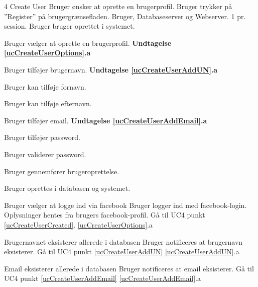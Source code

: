 
\uchead
	{4}
	{Create User}
	{Bruger ønsker at oprette en brugerprofil.}
	{Bruger trykker på ''Register'' på brugergrænsefladen.}
	{Bruger, Databaseserver og Webserver.}
	{} %
	{}
	{1 pr. session.}
	{Bruger bruger oprettet i systemet.}

\item \label{ucCreateUserOptions} Bruger vælger at oprette en brugerprofil. \newline
\textbf{Undtagelse \ref{ucCreateUserOptions}.a}

\item \label{ucCreateUserAddUN} Bruger tilføjer brugernavn.
\textbf{Undtagelse \ref{ucCreateUserAddUN}.a}

\item Bruger kan tilføje fornavn.
\item Bruger kan tilføje efternavn.

\item \label{ucCreateUserAddEmail} Bruger tilføjer email.
\textbf{Undtagelse \ref{ucCreateUserAddEmail}.a}

\item Bruger tilføjer password.

\item Bruger validerer password.

\item Bruger gennemfører brugeroprettelse.

\item \label{ucCreateUserCreated} Bruger oprettes i databasen og systemet.

\ucdescriptionend


\ucextension
	{Bruger vælger at logge ind via facebook}
	{Bruger logger ind med facebook-login. \newline
	\indent Oplysninger hentes fra brugers facebook-profil. \newline
	\indent Gå til UC4 punkt \ref{ucCreateUserCreated}.
	}
	{\ref{ucCreateUserOptions}.a}

	
	
\ucextension
	{Brugernavnet eksisterer allerede i databasen}
	{Bruger notificeres at brugernavn eksisterer.\newline
	Gå til UC4 punkt \ref{ucCreateUserAddUN}}
	{\ref{ucCreateUserAddUN}.a}
	


\ucextension
	{Email eksisterer allerede i databasen}
	{Bruger notificeres at email eksisterer.\newline
	Gå til UC4 punkt \ref{ucCreateUserAddEmail}}
	{\ref{ucCreateUserAddEmail}.a}
		
